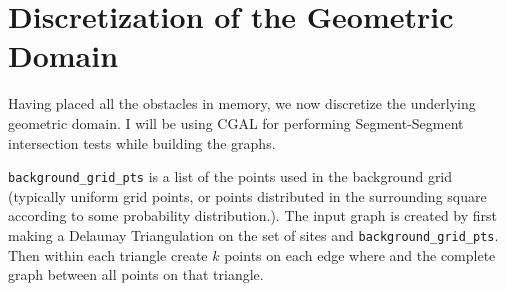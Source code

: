 \documentclass[11.5pt]{report}
\begin{document}

\section{Discretization of the Geometric Domain}

Having placed all the obstacles in memory, we now discretize the underlying geometric domain. 
I will be using CGAL for performing Segment-Segment intersection tests while building the graphs. 

\verb|background_grid_pts| is a list of the points used in the background grid
(typically uniform grid points, or points distributed in the surrounding square
according to some probability distribution.). The input graph is created by first 
making a Delaunay Triangulation on the set of sites and \verb|background_grid_pts|. 
Then within each triangle create $k$ points on each edge where and the complete graph 
between all points on that triangle. 
\end{document}
